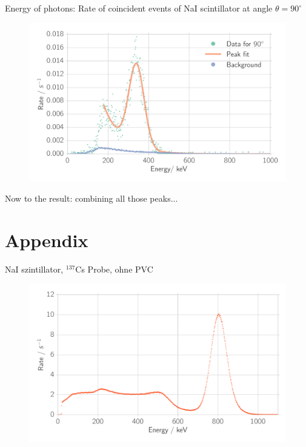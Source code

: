 \documentclass[xcolor=x11names,compress]{beamer}
\renewcommand{\(}{\begin{columns}}
\renewcommand{\)}{\end{columns}}
\newcommand{\<}[1]{\begin{column}{#1}}
\renewcommand{\>}{\end{column}}
\begin{document}
\begin{frame}[t]{Energy of photons: Rate of coincident events of NaI scintillator at angle $\theta = 90^\circ$}
\begin{figure}[htpb]
    \centering
    \includegraphics[width=1.0\linewidth]{../analysis/figures/coin_na_90}
    \label{fig:coin_na_30}
\end{figure}
\end{frame}

\begin{frame}[c]{}
    Now to the result: combining all those peaks...
\end{frame}


\section{Appendix}
\label{sec:appendix}
\begin{frame}[t]{NaI szintillator, $^{137}$Cs Probe, ohne PVC}
 \begin{figure}[htpb]
    \centering
    \includegraphics[width=1.0\linewidth]{../analysis/figures/na_total_incident}
    \label{fig:histo_na_137cs}
\end{figure}
\end{frame}
\end{document}
